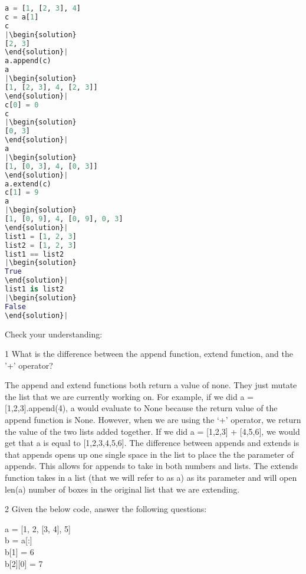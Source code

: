 \begin{lstlisting}[language=Python]
a = [1, [2, 3], 4]
c = a[1]
c
|\begin{solution}
[2, 3]
\end{solution}|
a.append(c)
a
|\begin{solution}
[1, [2, 3], 4, [2, 3]]
\end{solution}|
c[0] = 0
c
|\begin{solution}
[0, 3]
\end{solution}|
a
|\begin{solution}
[1, [0, 3], 4, [0, 3]]
\end{solution}|
a.extend(c)
c[1] = 9
a
|\begin{solution}
[1, [0, 9], 4, [0, 9], 0, 3]
\end{solution}|
list1 = [1, 2, 3]
list2 = [1, 2, 3]
list1 == list2
|\begin{solution}
True
\end{solution}|
list1 is list2
|\begin{solution}
False
\end{solution}|
\end{lstlisting}
\hfill \break
\question
Check your understanding:
\begin{paragraph}
1 What is the difference between the append function, extend function, and the '+' operator? 
\end{paragraph}
\begin{solution}
The append and extend functions both return a value of none. They just mutate the list that we are currently working on. For example, if we did a = [1,2,3].append(4), a would evaluate to None because the return value of the append function is None. However, when we are using the ‘+’ operator, we return the value of the two lists added together. If we did a = [1,2,3] + [4,5,6], we would get that a is equal to [1,2,3,4,5,6]. The difference between appends and extends is that appends opens up one single space in the list to place the the parameter of appends. This allows for appends to take in both numbers and lists. The extends function takes in a list (that we will refer to as a) as its parameter and will open len(a) number of boxes in the original list that we are extending. 
\end{solution}
\begin{paragraph}
2 Given the below code, answer the following questions:
\end{paragraph}
a = [1, 2, [3, 4], 5] \\
b = a[:] \\
b[1] = 6 \\
b[2][0] = 7 \\


